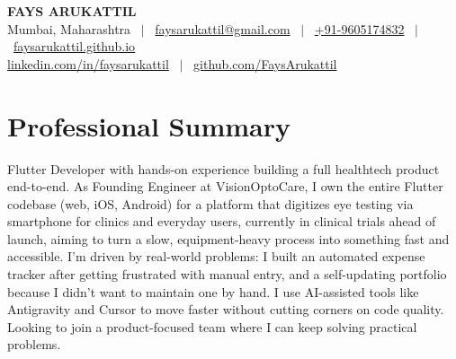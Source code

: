 \documentclass[letterpaper,10pt]{article}
\begin{document}
\begin{center}
    {\Huge \textbf{\color{primary}FAYS ARUKATTIL}} \\ \vspace{4pt}
    \small 
    Mumbai, Maharashtra \ $|$ \ 
    \href{mailto:faysarukattil@gmail.com}{\color{linkblue}faysarukattil@gmail.com} \ $|$ \ 
    \href{tel:+919605174832}{\color{linkblue}+91-9605174832} \ $|$ \ 
    \href{https://faysarukattil.github.io/FaysArukattil_Portfolio/}{\color{linkblue}faysarukattil.github.io} \\ \vspace{2pt}
    \href{https://linkedin.com/in/faysarukattil}{\color{linkblue}linkedin.com/in/faysarukattil} \ $|$ \ 
    \href{https://github.com/FaysArukattil}{\color{linkblue}github.com/FaysArukattil}
\end{center}


\section{Professional Summary}
\small{
Flutter Developer with hands-on experience building a full healthtech product end-to-end. As Founding Engineer at VisionOptoCare, I own the entire Flutter codebase (web, iOS, Android) for a platform that digitizes eye testing via smartphone for clinics and everyday users, currently in clinical trials ahead of launch, aiming to turn a slow, equipment-heavy process into something fast and accessible. I'm driven by real-world problems: I built an automated expense tracker after getting frustrated with manual entry, and a self-updating portfolio because I didn't want to maintain one by hand. I use AI-assisted tools like Antigravity and Cursor to move faster without cutting corners on code quality. Looking to join a product-focused team where I can keep solving practical problems.
}


\end{document}
